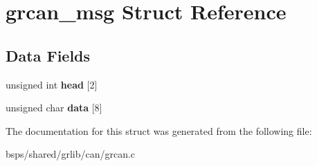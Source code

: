 \hypertarget{structgrcan__msg}{}\section{grcan\+\_\+msg Struct Reference}
\label{structgrcan__msg}
\subsection*{Data Fields}
\begin{DoxyCompactItemize}
\item 
\mbox{\label{structgrcan__msg_a6d5eae743f4dee90237e5a6a86b5fedc}} 
unsigned int {\bfseries head} \mbox{[}2\mbox{]}
\item 
\mbox{\label{structgrcan__msg_a602b06e82ac39c6522166f4a174ff92c}} 
unsigned char {\bfseries data} \mbox{[}8\mbox{]}
\end{DoxyCompactItemize}


The documentation for this struct was generated from the following file\+:\begin{DoxyCompactItemize}
\item 
bsps/shared/grlib/can/grcan.\+c\end{DoxyCompactItemize}

